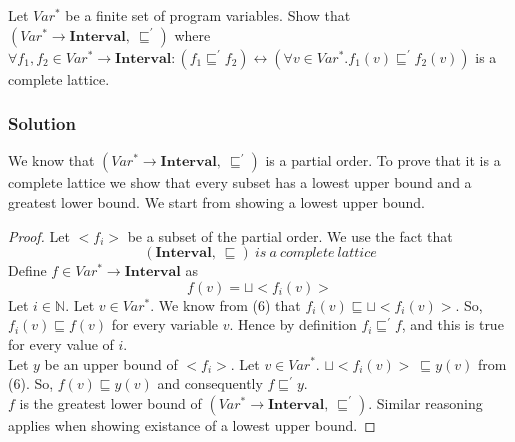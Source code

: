 Let $Var^*$ be a finite set of program variables.
Show that $(Var^* \rightarrow \mathbf{Interval},\ \sqsubseteq^{'})$ where $\forall f_1,f_2 \in Var^* \rightarrow \mathbf{Interval}:(f_1\sqsubseteq^{'}f_2)\longleftrightarrow (\forall v \in Var^*. f_1(v)\sqsubseteq^{'}f_2(v))$ is a complete lattice. 

\subsubsection*{Solution}
We know that $(Var^* \rightarrow \mathbf{Interval},\ \sqsubseteq^{'})$ is a partial order. To prove that it is a complete lattice we show that every subset has a lowest upper bound and a greatest lower bound. We start from showing a lowest upper bound.
\begin{proof}
	Let $<f_i>$ be a subset of the partial order.
	We use the fact that
	\begin{equation}
	(\mathbf{Interval},\ \sqsubseteq)\ is\ a\ complete\ lattice
	\end{equation}
	Define $f \in Var^* \rightarrow \mathbf{Interval}$ as
	\begin{equation*}
	f(v)=\sqcup <f_i(v)>
	\end{equation*}
	Let $i \in \mathbb{N}$. Let $v \in Var^*$. We know from (6) that $f_i(v)\sqsubseteq \sqcup<f_i(v)>$. So, $f_i(v)\sqsubseteq f(v)$ for every variable $v$. Hence by definition $f_i\sqsubseteq^{'}f$, and this is true for every value of $i$.\\
	
	Let $y$ be an upper bound of $<f_i>$. Let $v \in Var^*$. $\sqcup<f_i(v)>\ \sqsubseteq y(v)$ from (6). So, $f(v)\sqsubseteq y(v)$ and consequently $f\sqsubseteq^{'}y$.\\
	
	$f$ is the greatest lower bound of $(Var^* \rightarrow \mathbf{Interval},\ \sqsubseteq^{'})$. Similar reasoning applies when showing existance of a lowest upper bound.
\end{proof}